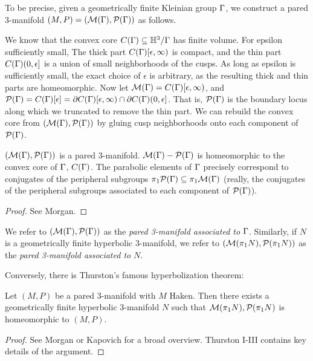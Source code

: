 To be precise, given a geometrically finite Kleinian group $\Gamma$, we construct
a pared 3-manifold $(M,P)=(\mathcal{M}(\Gamma),\mathcal{P}(\Gamma))$ as follows.

We know that the convex core $C(\Gamma) \subseteq \mathbb{H}^3/\Gamma$ has finite volume. For
epsilon sufficiently small, The thick part $C(\Gamma)[\epsilon,\infty)$ is
compact, and the thin part $C(\Gamma)(0,\epsilon]$ is a union of small
neighborhoods of the cusps.  As long as epsilon is sufficiently small, the
exact choice of $\epsilon$ is arbitrary, as the resulting thick and thin parts
are homeomorphic.  Now let $\mathcal{M}(\Gamma) = C(\Gamma)[\epsilon,\infty)$, and $\mathcal{P}(\Gamma)
= C(\Gamma)[\epsilon] = \partial C(\Gamma)[\epsilon,\infty) \cap \partial C(\Gamma)(0,\epsilon]$.
That is, $\mathcal{P}(\Gamma)$ is the boundary locus along which we truncated to remove
the thin part. We can rebuild the convex core from $(\mathcal{M}(\Gamma),\mathcal{P}(\Gamma))$ by
gluing cusp neighborhoods onto each component of $\mathcal{P}(\Gamma)$.

\begin{prop}

$(\mathcal{M}(\Gamma),\mathcal{P}(\Gamma))$ is a pared 3-manifold. $\mathcal{M}(\Gamma)- \mathcal{P}(\Gamma)$ is
homeomorphic to the convex core of $\Gamma$, $C(\Gamma)$. The parabolic elements of
$\Gamma$ precisely correspond to conjugates of the peripheral subgroups
$\pi_1\mathcal{P}(\Gamma) \subseteq \pi_1\mathcal{M}(\Gamma)$ (really, the conjugates of the peripheral
subgroups associated to each component of $\mathcal{P}(\Gamma)$).

\end{prop}

\begin{proof}

See Morgan. %

\end{proof}

We refer to $(\mathcal{M}(\Gamma),\mathcal{P}(\Gamma))$ as the \emph{pared 3-manifold associated to}
$\Gamma$.  Similarly, if $N$ is a geometrically finite hyperbolic 3-manifold, we
refer to $(\mathcal{M}(\pi_1N),\mathcal{P}(\pi_1N))$ as the \emph{pared 3-manifold associated
to} $N$.

Conversely, there is Thurston's famous hyperbolization theorem:

\begin{thm}

Let $(M,P)$ be a pared 3-manifold with $M$ Haken. Then there exists
a geometrically finite hyperbolic 3-manifold $N$ such that
$\mathcal{M}(\pi_1N),\mathcal{P}(\pi_1N)$ is homeomorphic to $(M,P)$.

\end{thm}

\begin{proof}

See Morgan or Kapovich for a broad overview. Thurston I-III contains key
details of the argument.

\end{proof}

